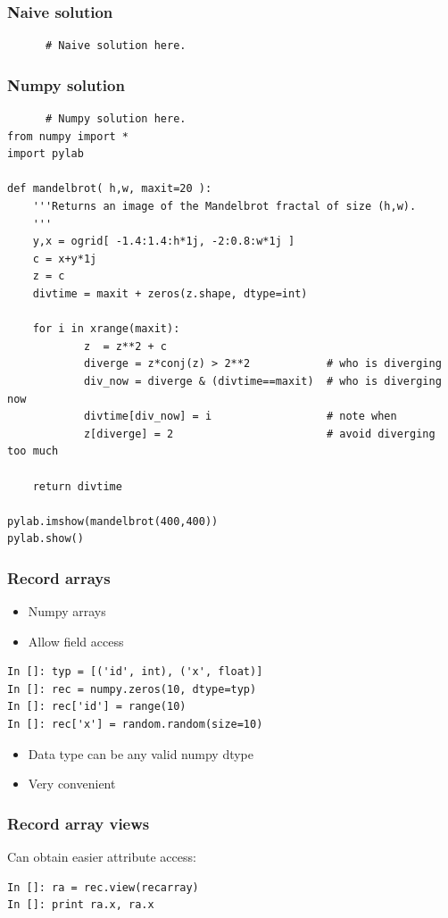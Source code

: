 \documentclass[14pt,compress]{beamer}
\newcounter{time}
\begin{document}
\begin{frame}[fragile]
  \frametitle{Naive solution}
  \begin{lstlisting}
      # Naive solution here.
  \end{lstlisting}
\end{frame}

\begin{frame}[fragile]
  \frametitle{Numpy solution}
  \small
  \begin{lstlisting}
      # Numpy solution here.
from numpy import *
import pylab

def mandelbrot( h,w, maxit=20 ):
    '''Returns an image of the Mandelbrot fractal of size (h,w).
    '''
    y,x = ogrid[ -1.4:1.4:h*1j, -2:0.8:w*1j ]
    c = x+y*1j
    z = c
    divtime = maxit + zeros(z.shape, dtype=int)

    for i in xrange(maxit):
            z  = z**2 + c
            diverge = z*conj(z) > 2**2            # who is diverging
            div_now = diverge & (divtime==maxit)  # who is diverging now
            divtime[div_now] = i                  # note when
            z[diverge] = 2                        # avoid diverging too much

    return divtime

pylab.imshow(mandelbrot(400,400))
pylab.show()
  \end{lstlisting}
\end{frame}


\begin{frame}[fragile]
    \frametitle{Record arrays}
    \begin{itemize}
        \item Numpy arrays
        \item Allow field access 
    \end{itemize}
    \begin{lstlisting}
In []: typ = [('id', int), ('x', float)]
In []: rec = numpy.zeros(10, dtype=typ)
In []: rec['id'] = range(10)
In []: rec['x'] = random.random(size=10)
    \end{lstlisting}
    \begin{itemize}
        \item Data type can be any valid numpy dtype
        \item Very convenient
    \end{itemize}
\end{frame}

\begin{frame}[fragile]
    \frametitle{Record array views}
Can obtain easier attribute access:

    \begin{lstlisting}
In []: ra = rec.view(recarray)
In []: print ra.x, ra.x
    \end{lstlisting}
\end{frame}
\end{document}

